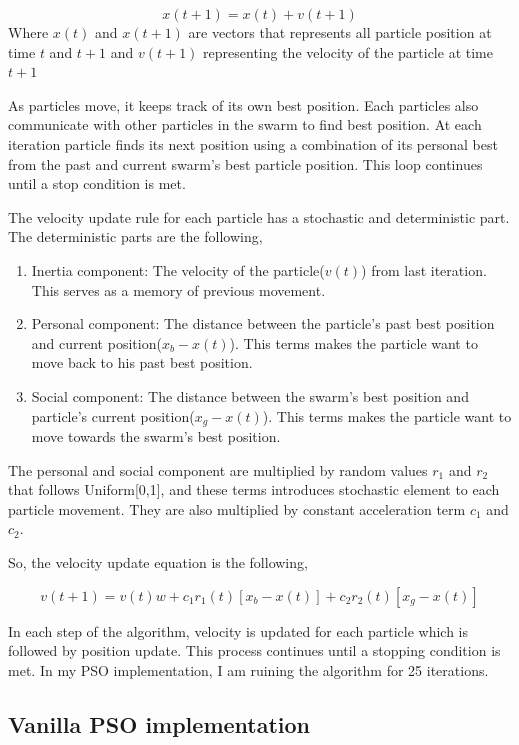 \documentclass{article}
\begin{document}
\begin{equation}
x(t+1) = x(t) + v(t+1)
\end{equation}
Where $x(t)$ and $x(t+1)$ are vectors that represents all particle position at time $t$ and $t+1$ and $v(t+1)$ representing the velocity of the particle at time $t+1$

As particles move, it keeps track of its own best position. Each particles also communicate with other particles in the swarm to find best position. At each iteration particle finds its next position using a combination of its personal best from the past and current swarm's best particle position. This loop continues until a stop condition is met.

The velocity update rule for each particle has a stochastic and deterministic part. The deterministic parts are the following,
\begin{enumerate}
\item Inertia component: The velocity of the particle($v(t)$) from last iteration. This serves as a memory of previous movement.
\item Personal component: The distance between the particle's past best position and current position($x_b - x(t)$). This terms makes the particle want to move back to his past best position. 
\item Social component: The distance between the swarm's best position and particle's current position($x_g - x(t)$).  This terms makes the particle want to move towards the swarm's best position.
\end{enumerate}

The personal and social component are multiplied by random values $r_1$ and $r_2$ that follows Uniform[0,1], and these terms introduces stochastic element to each particle movement. They are also multiplied by constant acceleration term $c_1$ and $c_2$.

So, the velocity update equation is the following,

\begin{equation}
v(t+1) = v(t)w + c_1 r_1(t)[x_b - x(t)] +  c_2 r_2(t)[x_g - x(t)]
\end{equation}

In each step of the algorithm, velocity is updated for each particle which is followed by position update. This process continues until a stopping condition is met. In my PSO implementation, I am ruining the algorithm for 25 iterations.

\subsection{Vanilla PSO implementation}
\end{document}
